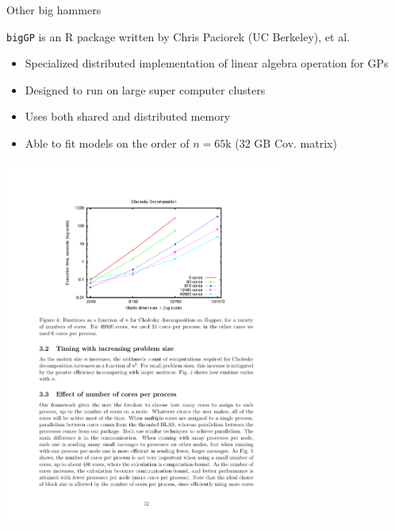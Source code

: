 \documentclass[11pt,ignorenonframetext,]{beamer}
\begin{document}
\begin{frame}[fragile]{Other big hammers}
\protect\hypertarget{other-big-hammers}{}

\small

\texttt{bigGP} is an R package written by Chris Paciorek (UC Berkeley),
et al.

\begin{itemize}
\item
  Specialized distributed implementation of linear algebra operation for
  GPs
\item
  Designed to run on large super computer clusters
\item
  Uses both shared and distributed memory
\item
  Able to fit models on the order of \(n = 65\)k (32 GB Cov. matrix)
\end{itemize}

\vspace{-3mm}

\begin{center}
\includegraphics[width=0.7\textwidth]{figs/Paciorek.pdf}
\end{center}

\end{frame}
\end{document}
